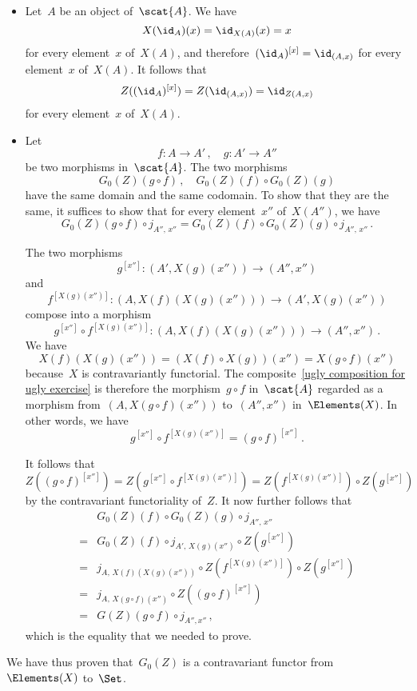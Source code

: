 \begin{itemize}

	\item
		Let~$A$ be an object of~$\scat{A}$.
		We have
		\[
			X(\id_A)(x)
			=
			\id_{X(A)}(x)
			=
			x
		\]
		for every element~$x$ of~$X(A)$, and therefore~$(\id_A)^{[x]} = \id_{(A, x)}$ for every element~$x$ of~$X(A)$.
		It follows that
		\[
			Z( (\id_A)^{[x]} )
			=
			Z( \id_{(A, x)} )
			=
			\id_{Z(A, x)}
		\]
		for every element~$x$ of~$X(A)$.

	\item
		Let
		\[
			f \colon A \to A' \,,
			\quad
			g \colon A' \to A''
		\]
		be two morphisms in~$\scat{A}$.
		The two morphisms
		\[
			G_0(Z)(g ∘ f) \,,
			\quad
			G_0(Z)(f) ∘ G_0(Z)(g)
		\]
		have the same domain and the same codomain.
		To show that they are the same, it suffices to show that for every element~$x''$ of~$X(A'')$, we have
		\[
			G_0(Z)(g ∘ f) ∘ j_{A'',\, x''}
			=
			G_0(Z)(f) ∘ G_0(Z)(g) ∘ j_{A'',\, x''} \,.
		\]

		The two morphisms
		\[
			g^{[x'']}
			\colon
			(A', X(g)(x'')) \to (A'', x'')
		\]
		and
		\[
			f^{[X(g)(x'')]}
			\colon
			(A, X(f)(X(g)(x''))) \to (A', X(g)(x''))
		\]
		compose into a morphism
		\begin{equation}
			\label{ugly composition for ugly exercise}
			g^{[x'']} ∘ f^{[X(g)(x'')]}
			\colon
			(A, X(f)(X(g)(x''))) \to (A'', x'') \,.
		\end{equation}
		We have
		\[
			X(f)(X(g)(x''))
			=
			( X(f) ∘ X(g) )(x'')
			=
			X(g ∘ f)(x'')
		\]
		because~$X$ is contravariantly functorial.
		The composite~\eqref{ugly composition for ugly exercise} is therefore the morphism~$g ∘ f$ in~$\scat{A}$ regarded as a morphism from~$(A, X(g ∘ f)(x''))$ to~$(A'', x'')$ in~$\Elements(X)$.
		In other words, we have
		\[
			g^{[x'']} ∘ f^{[X(g)(x'')]}
			=
			(g ∘ f)^{[x'']} \,.
		\]
		
		It follows that
		\[
			Z( (g ∘ f)^{[x'']} )
			=
			Z( g^{[x'']} ∘ f^{[X(g)(x'')]} )
			=
			Z( f^{[X(g)(x'')]} ) ∘ Z( g^{[x'']} )
		\]
		by the contravariant functoriality of~$Z$.
		It now further follows that
		\begin{align*}
			{}&
			G_0(Z)(f) ∘ G_0(Z)(g) ∘ j_{A'',\, x''}
			\\
			={}&
			G_0(Z)(f) ∘ j_{A',\, X(g)(x'')} ∘ Z( g^{[x'']} )
			\\
			={}&
			j_{A,\, X(f)(X(g)(x''))} ∘ Z( f^{[X(g)(x'')]} ) ∘ Z( g^{[x'']} )
			\\
			={}&
			j_{A,\, X(g ∘ f)(x'')} ∘ Z( (g ∘ f)^{[x'']} )
			\\
			={}&
			G(Z)(g ∘ f) ∘ j_{A'', x''} \,,
		\end{align*}
		which is the equality that we needed to prove.
\end{itemize}
We have thus proven that~$G_0(Z)$ is a contravariant functor from~$\Elements(X)$ to~$\Set$.

